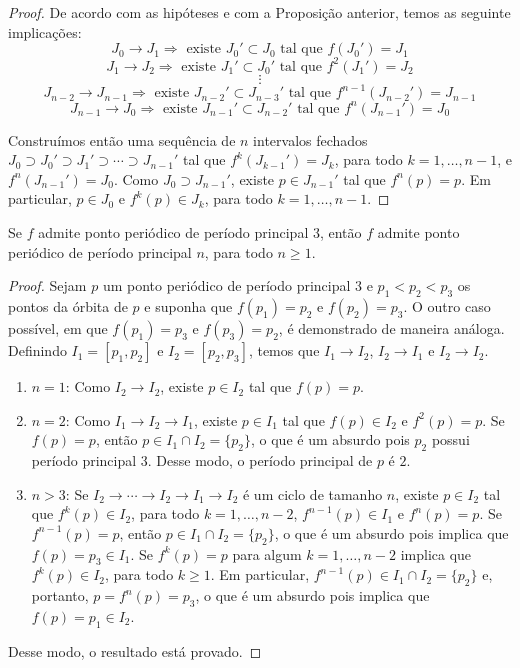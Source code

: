 \begin{proof}
De acordo com as hipóteses e com a Proposição anterior, temos as seguinte implicações:
$$ J_0 \longrightarrow J_1 \Rightarrow \textrm{ existe } J_0' \subset J_0 \textrm{ tal que } f(J_0') = J_1$$
$$ J_1 \longrightarrow J_2 \Rightarrow \textrm{ existe } J_1' \subset J_0' \textrm{ tal que } f^2(J_1') = J_2$$
$$\vdots$$
$$ J_{n-2} \longrightarrow J_{n-1} \Rightarrow \textrm{ existe } J_{n-2}' \subset J_{n-3}' \textrm{ tal que } f^{n-1}(J_{n-2}') = J_{n-1} $$
$$ J_{n-1} \longrightarrow J_0 \Rightarrow \textrm{ existe } J_{n-1}' \subset J_{n-2}' \textrm{ tal que } f^n(J_{n-1}') = J_0$$

Construímos então uma sequência de $n$ intervalos fechados $J_0 \supset J_0' \supset J_1' \supset \cdots \supset J_{n-1}'$ tal que $f^k(J_{k-1}') = J_k$, para todo $k = 1, \dots, n-1$, e $f^n(J_{n-1}') = J_0$. Como $J_0 \supset J_{n-1}'$, existe $p \in J_{n-1}'$ tal que $f^n(p) = p$. Em particular, $p \in J_0$ e $f^k(p) \in J_k$, para todo $k = 1, \dots, n-1$. 
\end{proof}

\begin{theorem}
Se $f$ admite ponto periódico de período principal $3$, então $f$ admite ponto periódico de período principal $n$, para todo $n \geq 1$.
\end{theorem}

\begin{proof}
Sejam $p$ um ponto periódico de período principal $3$ e $p_1 < p_2 < p_3$ os pontos da órbita de $p$ e suponha que $f(p_1) = p_2$ e $f(p_2) = p _3$. O outro caso possível, em que $f(p_1) = p_3$ e $f(p_3) = p_2$, é demonstrado de maneira análoga. Definindo $I_1 = [p_1, p_2]$ e $I_2 = [p_2, p_3]$, temos que $I_1 \longrightarrow I_2$, $I_2 \longrightarrow I_1$ e $I_2 \longrightarrow I_2$.
\begin{enumerate}[label=(\alph*)]
\item $n = 1$: Como $I_2 \longrightarrow I_2$, existe $p \in I_2$ tal que $f(p) = p$.
\item $n = 2$: Como $I_1 \longrightarrow I_2 \longrightarrow I_1$, existe $p \in I_1$ tal que $f(p) \in I_2$ e $f^2(p) = p$. Se $f(p) = p$, então $p \in I_1 \cap I_2 = \{p_2\}$, o que é um absurdo pois $p_2$ possui período principal 3. Desse modo, o período principal de $p$ é $2$.
\item $n > 3$: Se $I_2 \longrightarrow \cdots \longrightarrow I_2 \longrightarrow I_1 \longrightarrow I_2$ é um ciclo de tamanho $n$, existe $p \in I_2$ tal que $f^k(p) \in I_2$, para todo $k = 1, \dots, n-2$, $f^{n-1}(p) \in I_1$ e $f^n(p) = p$. Se $f^{n-1}(p) = p$, então $p \in I_1 \cap I_2 = \{p_2\}$, o que é um absurdo pois implica que $f(p) = p_3 \in I_1$. Se $f^k(p) = p$ para algum $k = 1, \dots, n-2$ implica que $f^k(p) \in I_2$, para todo $k \geq 1$. Em particular, $f^{n-1}(p) \in I_1 \cap I_2 = \{p_2\}$ e, portanto, $p = f^n(p) = p_3$, o que é um absurdo pois implica que $f(p) = p_1 \in I_2$. 
\end{enumerate}
Desse modo, o resultado está provado.
\end{proof}

